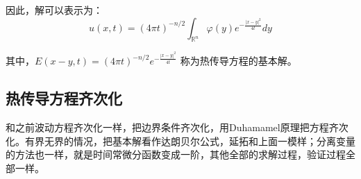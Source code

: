 \documentclass[12pt,a4paper]{article}
\numberwithin{subsection}{section}   %
\numberwithin{subsubsection}{subsection}
\theoremstyle{plain}
\theoremstyle{definition}
\theoremstyle{remark}
\theoremstyle{remark}
\begin{document}
	
	
	
	因此，解可以表示为：
	\begin{equation}
		u(x, t) = (4\pi t)^{-n/2} \int_{\mathbb{R}^n} \varphi(y) e^{-\frac{|x - y|^2}{4t}} dy
	\end{equation}
	
	其中，\( E(x - y, t) = (4\pi t)^{-n/2} e^{-\frac{|x - y|^2}{4t}} \) 称为热传导方程的基本解。
	
	\subsection{热传导方程齐次化}
	和之前波动方程齐次化一样，把边界条件齐次化，用Duhamamel原理把方程齐次化。有界无界的情况，把基本解看作达朗贝尔公式，延拓和上面一模样；分离变量的方法也一样，就是时间常微分函数变成一阶，其他全部的求解过程，验证过程全部一样。
	
	
	
	
	
	
	
\end{document}
